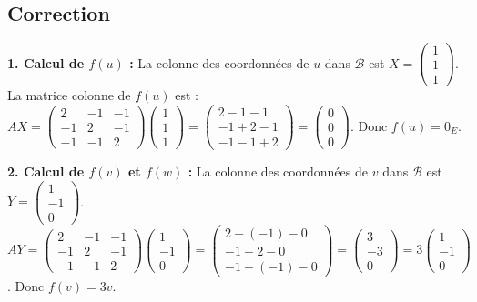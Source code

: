 \documentclass{report}
\begin{document}
\subsection*{Correction}
\textbf{1. Calcul de $f(u)$ :}
La colonne des coordonnées de $u$ dans $\mathcal{B}$ est $X = \begin{pmatrix} 1 \\ 1 \\ 1 \end{pmatrix}$.
La matrice colonne de $f(u)$ est :
$AX = \begin{pmatrix} 2 & -1 & -1 \\ -1 & 2 & -1 \\ -1 & -1 & 2 \end{pmatrix} \begin{pmatrix} 1 \\ 1 \\ 1 \end{pmatrix} = \begin{pmatrix} 2-1-1 \\ -1+2-1 \\ -1-1+2 \end{pmatrix} = \begin{pmatrix} 0 \\ 0 \\ 0 \end{pmatrix}$.
Donc $f(u) = 0_E$.

\textbf{2. Calcul de $f(v)$ et $f(w)$ :}
La colonne des coordonnées de $v$ dans $\mathcal{B}$ est $Y = \begin{pmatrix} 1 \\ -1 \\ 0 \end{pmatrix}$.
$AY = \begin{pmatrix} 2 & -1 & -1 \\ -1 & 2 & -1 \\ -1 & -1 & 2 \end{pmatrix} \begin{pmatrix} 1 \\ -1 \\ 0 \end{pmatrix} = \begin{pmatrix} 2-(-1)-0 \\ -1-2-0 \\ -1-(-1)-0 \end{pmatrix} = \begin{pmatrix} 3 \\ -3 \\ 0 \end{pmatrix} = 3 \begin{pmatrix} 1 \\ -1 \\ 0 \end{pmatrix}$.
Donc $f(v) = 3v$.
\end{document}
